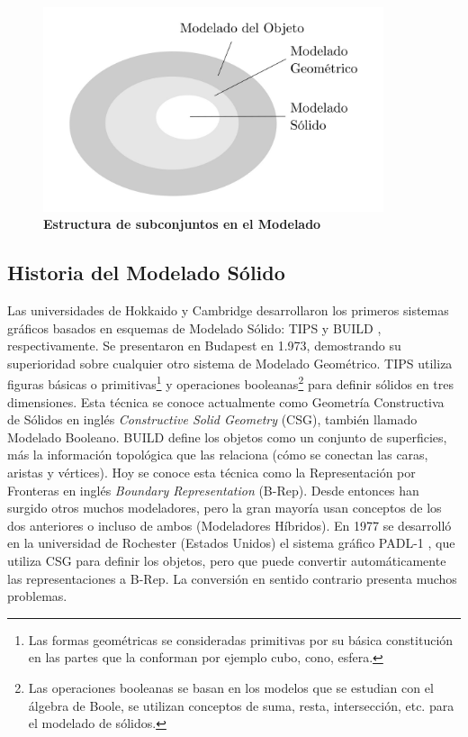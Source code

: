 \begin{figure}[h]
\includegraphics[width=10cm]{Img/GEO/geo-modelado0.jpg}
\centering
\caption{\textbf{\footnotesize{Estructura de subconjuntos en el Modelado}}}
\end{figure}


\subsection{Historia del Modelado Sólido }
Las universidades de Hokkaido y Cambridge desarrollaron los primeros sistemas gráficos basados en esquemas de Modelado Sólido: TIPS y BUILD \citep{Toriya:1993:CPA:562297}, respectivamente. Se presentaron en Budapest en 1.973, demostrando su superioridad sobre cualquier otro sistema de Modelado Geométrico.
TIPS utiliza figuras básicas o primitivas\footnote{ Las formas geométricas se consideradas primitivas por su básica constitución en las partes que la conforman por ejemplo cubo, cono, esfera.} y operaciones booleanas\footnote{Las operaciones booleanas se basan en los modelos que se estudian con el álgebra de Boole, se utilizan conceptos de suma, resta, intersección, etc. para el modelado de sólidos.} para definir sólidos en tres dimensiones. Esta técnica se conoce actualmente como Geometría Constructiva de Sólidos en inglés \textit{Constructive Solid Geometry} (CSG), también llamado Modelado Booleano.
BUILD define los objetos como un conjunto de superficies, más la información topológica que las relaciona (cómo se conectan las caras, aristas y vértices). Hoy se conoce esta técnica como la Representación por Fronteras en inglés \textit{Boundary Representation} (B-Rep).
Desde entonces han surgido otros muchos modeladores, pero la gran mayoría usan conceptos de los dos anteriores o incluso de ambos (Modeladores Híbridos).
En 1977 se desarrolló en la universidad de Rochester (Estados Unidos) el sistema gráfico PADL-1 \citep{Toriya:1993:CPA:562297}, que utiliza CSG para definir los objetos, pero que puede convertir automáticamente las representaciones a B-Rep. La conversión en sentido contrario presenta muchos problemas. 

